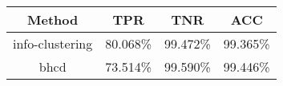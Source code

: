 \begin{tabular}{cccc}
\hline
     Method      &   TPR    &   TNR    &   ACC    \\
\hline
 info-clustering & 80.068\% & 99.472\% & 99.365\% \\
      bhcd       & 73.514\% & 99.590\% & 99.446\% \\
\hline
\end{tabular}